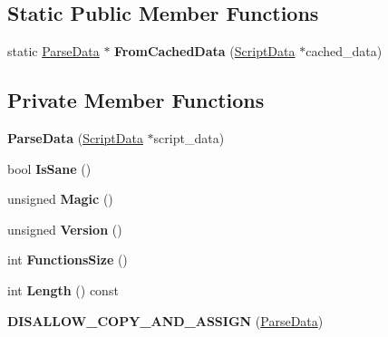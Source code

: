 \subsection*{Static Public Member Functions}
\begin{DoxyCompactItemize}
\item 
static \hyperlink{classv8_1_1internal_1_1_parse_data}{Parse\+Data} $\ast$ {\bfseries From\+Cached\+Data} (\hyperlink{classv8_1_1internal_1_1_script_data}{Script\+Data} $\ast$cached\+\_\+data)\hypertarget{classv8_1_1internal_1_1_parse_data_a4a11d243cd4e09d2ffa2e16a9330f62a}{}\label{classv8_1_1internal_1_1_parse_data_a4a11d243cd4e09d2ffa2e16a9330f62a}

\end{DoxyCompactItemize}
\subsection*{Private Member Functions}
\begin{DoxyCompactItemize}
\item 
{\bfseries Parse\+Data} (\hyperlink{classv8_1_1internal_1_1_script_data}{Script\+Data} $\ast$script\+\_\+data)\hypertarget{classv8_1_1internal_1_1_parse_data_afc234dfebd4a8dd3634d00c7a92ca17e}{}\label{classv8_1_1internal_1_1_parse_data_afc234dfebd4a8dd3634d00c7a92ca17e}

\item 
bool {\bfseries Is\+Sane} ()\hypertarget{classv8_1_1internal_1_1_parse_data_a68f4e94c3228e99959a558807e16ba1b}{}\label{classv8_1_1internal_1_1_parse_data_a68f4e94c3228e99959a558807e16ba1b}

\item 
unsigned {\bfseries Magic} ()\hypertarget{classv8_1_1internal_1_1_parse_data_a635e81570423368607ae501bfcaeff64}{}\label{classv8_1_1internal_1_1_parse_data_a635e81570423368607ae501bfcaeff64}

\item 
unsigned {\bfseries Version} ()\hypertarget{classv8_1_1internal_1_1_parse_data_a9065ff52c14c1cd86e2eac0d40a228e8}{}\label{classv8_1_1internal_1_1_parse_data_a9065ff52c14c1cd86e2eac0d40a228e8}

\item 
int {\bfseries Functions\+Size} ()\hypertarget{classv8_1_1internal_1_1_parse_data_af74de5ea08d1924ab3e3ffe651df9686}{}\label{classv8_1_1internal_1_1_parse_data_af74de5ea08d1924ab3e3ffe651df9686}

\item 
int {\bfseries Length} () const \hypertarget{classv8_1_1internal_1_1_parse_data_a85e0e5072d1d5e3ccf3e27b452477314}{}\label{classv8_1_1internal_1_1_parse_data_a85e0e5072d1d5e3ccf3e27b452477314}

\item 
{\bfseries D\+I\+S\+A\+L\+L\+O\+W\+\_\+\+C\+O\+P\+Y\+\_\+\+A\+N\+D\+\_\+\+A\+S\+S\+I\+GN} (\hyperlink{classv8_1_1internal_1_1_parse_data}{Parse\+Data})\hypertarget{classv8_1_1internal_1_1_parse_data_a7eb6ad99682267e1ace55873c297cdda}{}\label{classv8_1_1internal_1_1_parse_data_a7eb6ad99682267e1ace55873c297cdda}

\end{DoxyCompactItemize}
